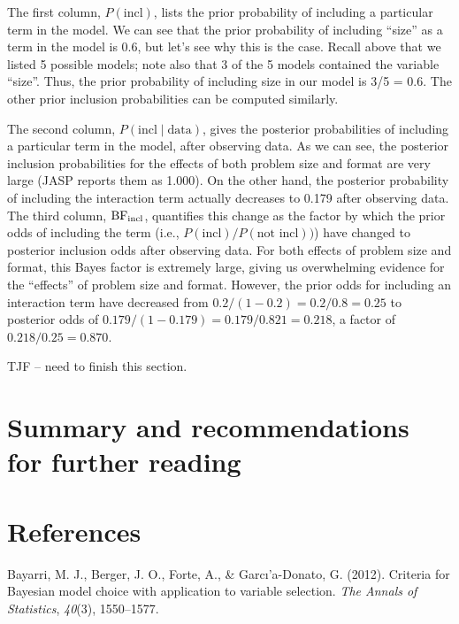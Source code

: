 \documentclass[english,,doc,floatsintext]{apa6}
\begin{document}
The first column, \(P(\text{incl})\), lists the prior probability of including a particular term in the model. We can see that the prior probability of including \enquote{size} as a term in the model is 0.6, but let's see why this is the case. Recall above that we listed 5 possible models; note also that 3 of the 5 models contained the variable \enquote{size}. Thus, the prior probability of including size in our model is 3/5 = 0.6. The other prior inclusion probabilities can be computed similarly.

The second column, \(P(\text{incl}\mid\text{data})\), gives the posterior probabilities of including a particular term in the model, after observing data. As we can see, the posterior inclusion probabilities for the effects of both problem size and format are very large (JASP reports them as 1.000). On the other hand, the posterior probability of including the interaction term actually decreases to 0.179 after observing data. The third column, \(\textnormal{BF}_{\text{incl}}\), quantifies this change as the factor by which the prior odds of including the term (i.e., \(P(\text{incl})/P(\text{not incl}))\)) have changed to posterior inclusion odds after observing data. For both effects of problem size and format, this Bayes factor is extremely large, giving us overwhelming evidence for the \enquote{effects} of problem size and format. However, the prior odds for including an interaction term have decreased from \(0.2/(1-0.2) = 0.2/0.8 = 0.25\) to posterior odds of \(0.179/(1-0.179) = 0.179/0.821 = 0.218\), a factor of \(0.218/0.25 = 0.870\).

TJF -- need to finish this section.

\hypertarget{summary-and-recommendations-for-further-reading}{%
\section{Summary and recommendations for further reading}\label{summary-and-recommendations-for-further-reading}}

\newpage

\hypertarget{references}{%
\section{References}\label{references}}

\setlength{\parindent}{-0.5in}
\setlength{\leftskip}{0.5in}

\hypertarget{refs}{}
\leavevmode\hypertarget{ref-bayarri2012criteria}{}%
Bayarri, M. J., Berger, J. O., Forte, A., \& Garcı'a-Donato, G. (2012). Criteria for Bayesian model choice with application to variable selection. \emph{The Annals of Statistics}, \emph{40}(3), 1550--1577.
\end{document}
